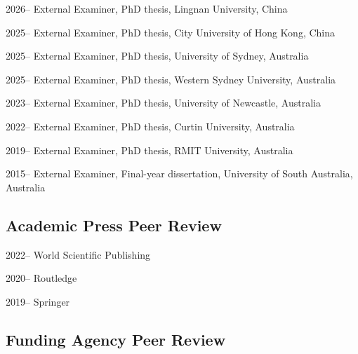 \documentclass[11pt,a4paper]{report} %
\begin{document}
    \begin{tablist}

        \item[2026--]    \tab{}External Examiner, PhD thesis, Lingnan University, China

        \item[2025--]    \tab{}External Examiner, PhD thesis, City University of Hong Kong, China
        
        \item[2025--]    \tab{}External Examiner, PhD thesis, University of Sydney, Australia
        
        \item[2025--]    \tab{}External Examiner, PhD thesis, Western Sydney University, Australia
        
        \item[2023--]    \tab{}External Examiner, PhD thesis, University of Newcastle, Australia
        
        \item[2022--]  \tab{}External Examiner, PhD thesis, Curtin University, Australia
        
        \item[2019--]    \tab{}External Examiner, PhD thesis, RMIT University, Australia
        
        \item[2015--]    \tab{}External Examiner, Final-year dissertation, University of South Australia, Australia
    
    \end{tablist}

    \subsection*{Academic Press Peer Review}

    \begin{tablist}

        \item[2022--] \tab{}World Scientific Publishing
        
        \item[2020--] \tab{}Routledge

        \item[2019--] \tab{}Springer

    \end{tablist}

    \subsection*{Funding Agency Peer Review}
\end{document}

